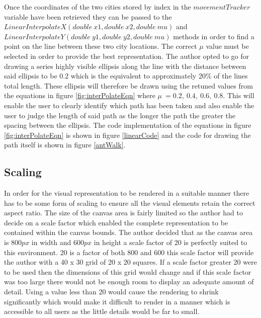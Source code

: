 Once the coordinates of the two cities stored by index in the $movementTracker$ variable have been retrieved they can be passed to the $LinearInterpolateX(double\ x1, double\ x2, double\ mu)$ and $LinearInterpolateY(double\ y1, double\ y2, double\ mu)$ methods in order to find a point on the line between these two city locations. The correct $\mu$ value must be selected in order to provide the best representation. The author opted to go for drawing a series highly visible ellipsis along the line with the distance between said ellipsis to be 0.2 which is the equivalent to approximately 20\% of the lines total length. These ellipsis will therefore be drawn using the retuned values from the equations in figure \ref{fig:interPolateEqn} where $\mu\ = 0.2,\ 0.4,\ 0.6,\ 0.8$. This will enable the user to clearly identify which path has been taken and also enable the user to judge the length of said path as the longer the path the greater the spacing between the ellipsis. The code implementation of the equations in figure \ref{fig:interPolateEqn} is shown in figure \ref{linearCode} and the code for drawing the path itself is shown in figure \ref{antWalk}.

\subsection{Scaling}
\label{scaley}
In order for the visual representation to be rendered in a suitable manner there has to be some form of scaling to ensure all the visual elements retain the correct aspect ratio. The size of the canvas area is fairly limited so the author had to decide on a scale factor which enabled the complete representation to be contained within the canvas bounds. The author decided that as the canvas area is $800px$ in width and $600px$ in height a scale factor of 20 is perfectly suited to this environment. 20 is a factor of both 800 and 600 this scale factor will provide the author with a 40 x 30 grid of 20 x 20 squares. If a scale factor greater 20 were to be used then the dimensions of this grid would change and if this scale factor was too large there would not be enough room to display an adequate amount of detail. Using a value less than 20 would cause the rendering to shrink significantly which would make it difficult to render in a manner which is accessible to all users as the little details would be far to small.

